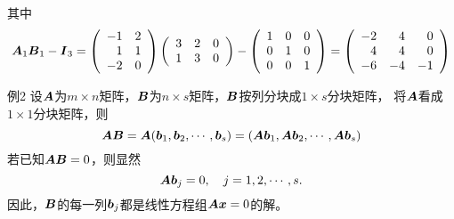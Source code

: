 \begin{frame}
\begin{footnotesize}
        其中
        $$
        \boldsymbol{A}_1\boldsymbol{B}_1-\boldsymbol{I}_3 = \left(
        \begin{array}{rr}
          -1&2\\
          1&1\\
          -2&0
        \end{array}
        \right)\left(
        \begin{array}{rrr}
          3&2&0\\
          1&3&0
        \end{array}
        \right)-\left(
        \begin{array}{ccc}
          1&0&0\\
          0&1&0\\
          0&0&1
        \end{array}
        \right)=\left(
        \begin{array}{rrr}
          -2&4&0\\
          4&4&0\\
          -6&-4&-1
        \end{array}
        \right)
        $$
  \end{footnotesize}
\end{frame}


\begin{frame}
  \begin{footnotesize}
    \begin{exampleblock}{例2}
      设$\boldsymbol{A}$为$m\times n$矩阵，$\boldsymbol{B}$为$n\times s$矩阵，$\boldsymbol{B}$按列分块成$1\times s$分块矩阵，
      将$\boldsymbol{A}$看成$1\times 1$分块矩阵，则
      $$
      \boldsymbol{A}\boldsymbol{B}=\boldsymbol{A}({\boldsymbol{b}}_1,{\boldsymbol{b}}_2,\cdots,{\boldsymbol{b}}_s)=(\boldsymbol{A}{\boldsymbol{b}}_1,\boldsymbol{A}{\boldsymbol{b}}_2,\cdots,\boldsymbol{A}{\boldsymbol{b}}_s)      
      $$
      若已知$\boldsymbol{A}\boldsymbol{B}=0$，则显然
      $$
      \boldsymbol{A}{\boldsymbol{b}}_j=0, \quad j=1,2,\cdots,s.
      $$
      因此，$\boldsymbol{B}$的每一列${\boldsymbol{b}}_j$都是线性方程组$\boldsymbol{A}{\boldsymbol{x}}=0$的解。
    \end{exampleblock}    
  \end{footnotesize}
\end{frame}


